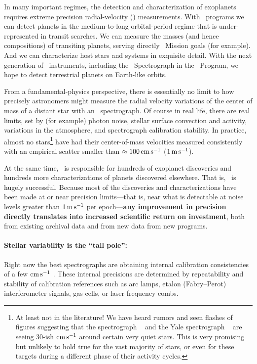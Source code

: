 \documentclass[12pt, letterpaper]{article}
\begin{document}
\sloppy\sloppypar\raggedbottom\frenchspacing


In many important regimes, the detection and characterization of exoplanets
requires extreme precision radial-velocity (\EPRV)
measurements.
With \EPRV\ programs we can detect planets in the medium-to-long 
orbital-period regime that is under-represented in transit searches.
We can measure the 
masses (and hence compositions) of transiting planets,
serving directly \TESS\ Mission goals (for example).
And we can characterize host stars and systems in exquisite detail.
With the next generation of \EPRV\ 
instruments, including the \NEID\ Spectrograph in the \NNEXPLORE\ Program,
we hope to detect terrestrial planets on Earth-like orbits.

From a fundamental-physics perspective, there is essentially no limit to how
precisely astronomers might measure the radial velocity variations
of the center of mass of a distant star with an \EPRV\ spectrograph.
Of course in real life, there are real limits, set
by (for example) photon noise, stellar surface convection and activity,
variations in the atmosphere, and spectrograph calibration stability.
In practice, almost no stars\footnote{%
  At least not in the literature! We have heard rumors and 
  seen flashes of figures suggesting that the  spectrograph
  \ESPRESSO\ \citep{Pepe2010} and the Yale spectrograph \EXPRES\ 
  \citep{Jurgenson2016} are seeing 
  30-ish ${\mathrm{cm\,s^{-1}}}$ around certain very quiet stars. This is very promising but 
  unlikely to hold true for the vast majority of stars, or even for these targets during a
  different phase of their activity cycles.}
have had their center-of-mass
velocities measured consistently with an empirical scatter
smaller than $\approx 100\,{\mathrm{cm\,s^{-1}}}$ 
($1\,{\mathrm{m\,s^{-1}}}$).

At the same time, \EPRV\ is responsible for hundreds of  exoplanet discoveries and hundreds more \foreign{a
posteriori} characterizations of planets discovered elsewhere.
That is, \EPRV\ is hugely successful.
Because most of the discoveries and characterizations have been made
at or near precision limits---that is, near what is detectable at noise levels
greater than $1\,{\mathrm{m\,s^{-1}}}$ per epoch---\textbf{any improvement in precision directly
translates into increased scientific return on investment},
both from existing archival data and from new data from new programs.

\paragraph{Stellar variability is the ``tall pole'':}
Right now the best spectrographs are obtaining internal calibration
consistencies of a few ${\mathrm{cm\,s^{-1}}}$ \citep{espresso-eprv4, expres-eprv4}.
These internal precisions are determined by repeatability and
stability of calibration references such as arc lamps, etalon
(Fabry--Perot) interferometer signals, gas cells, or laser-frequency
combs.
\end{document}
